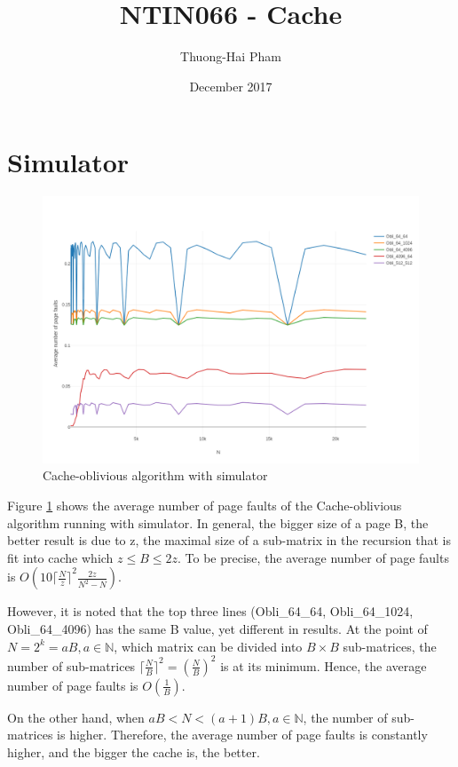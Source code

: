 \documentclass{article}
\title{NTIN066 - Cache}
\author{Thuong-Hai Pham}
\date{December 2017}
\begin{document}
\maketitle

\section{Simulator}

\begin{figure}[h!]
\centering
\includegraphics[width=\textwidth]{NTIN066-cache-data1.png}
\caption{Cache-oblivious algorithm with simulator}
\label{fig:plot1-obli}
\end{figure}

Figure \ref{fig:plot1-obli} shows the average number of page faults of the Cache-oblivious algorithm running with simulator. In general, the bigger size of a page B, the better result is due to z, the maximal size of a sub-matrix in the recursion that is fit into cache which $z\le B \le 2z$. To be precise, the average number of page faults is $O\left (10{\lceil \frac{N}{z} \rceil}^2 \frac{2z}{N^2-N}\right )$.

However, it is noted that the top three lines (Obli\_64\_64, Obli\_64\_1024, Obli\_64\_4096) has the same B value, yet different in results. At the point of $N=2^k=aB, a\in \mathbb{N}$, which matrix can be divided into $B\times B$ sub-matrices, the number of sub-matrices ${\lceil \frac{N}{B} \rceil}^2={\left ( \frac{N}{B} \right )}^2$ is at its minimum. Hence, the average number of page faults is $O(\frac{1}{B})$.

On the other hand, when $aB < N < (a+1)B, a\in \mathbb{N}$, the number of sub-matrices is higher. Therefore, the average number of page faults is constantly higher, and the bigger the cache is, the better.
\end{document}
